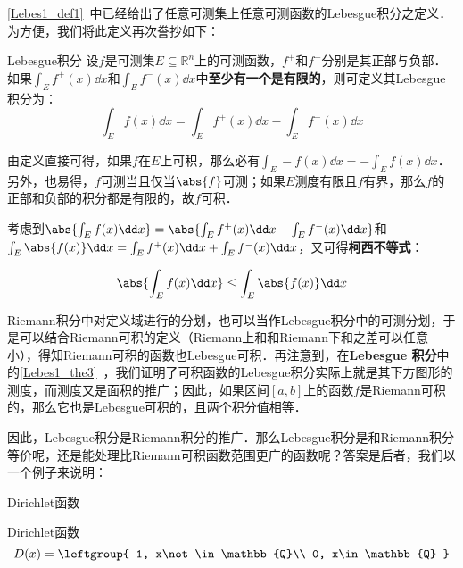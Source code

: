 

\autoref{Lebes1_def1}~中已经给出了任意可测集上任意可测函数的Lebesgue积分之定义．为方便，我们将此定义再次誊抄如下：

\begin{definition}{Lebesgue积分}
设$f$是可测集$E\subseteq\mathbb{R}^n$上的可测函数，$f^+$和$f^-$分别是其正部与负部．如果$\int_E f^+(x) \dd x$和$\int_E f^-(x) \dd x$中\textbf{至少有一个是有限的}，则可定义其Lebesgue积分为：
\begin{equation}
\int_E f(x) \dd x = \int_E f^+(x) \dd x - \int_E f^-(x) \dd x
\end{equation}
\end{definition}

由定义直接可得，如果$f$在$E$上可积，那么必有$\int_E -f(x) \dd x = -\int_E f(x) \dd x$．另外，也易得，$f$可测当且仅当$\abs{f}$可测；如果$E$测度有限且$f$有界，那么$f$的正部和负部的积分都是有限的，故$f$可积．

考虑到$\abs{\int_E f(x) \dd x}=\abs{\int_E f^+(x) \dd x - \int_E f^-(x) \dd x}$和$\int_E \abs{f(x)} \dd x = \int_E f^+(x) \dd x + \int_E f^-(x) \dd x$，又可得\textbf{柯西不等式}：

\begin{equation}
\abs{\int_E f(x) \dd x} \leq \int_E \abs{f(x)} \dd x
\end{equation}

Riemann积分中对定义域进行的分划，也可以当作Lebesgue积分中的可测分划，于是可以结合Riemann可积的定义（Riemann上和和Riemann下和之差可以任意小），得知Riemann可积的函数也Lebesgue可积．再注意到，在\textbf{Lebesgue 积分}中的\autoref{Lebes1_the3}~，我们证明了可积函数的Lebesgue积分实际上就是其下方图形的测度，而测度又是面积的推广；因此，如果区间$[a, b]$上的函数$f$是Riemann可积的，那么它也是Lebesgue可积的，且两个积分值相等．

因此，Lebesgue积分是Riemann积分的推广．那么Lebesgue积分是和Riemann积分等价呢，还是能处理比Riemann可积函数范围更广的函数呢？答案是后者，我们以一个例子来说明：

\begin{example}{Dirichlet函数}

Dirichlet函数
\begin{equation}
D(x)=
\leftgroup{
    1, x\not\in\mathbb{Q}\\
    0, x\in\mathbb{Q}
}
\end{equation}

\end{example}
















